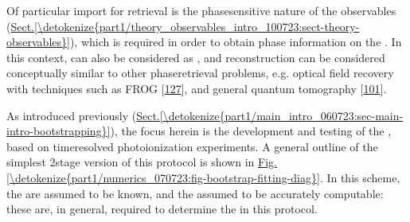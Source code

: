 \documentclass[letterpaper,table,10pt,english]{jupyterBook}
\begin{document}
\sphinxAtStartPar
Of particular import for {\hyperref[\detokenize{backmatter/glossary:term-radial-matrix-elements}]{}} retrieval is the phase\sphinxhyphen{}sensitive nature of the observables (\hyperref[\detokenize{part1/theory_observables_intro_100723:sect-theory-observables}]{Sect.\@ \ref{\detokenize{part1/theory_observables_intro_100723:sect-theory-observables}}}), which is required in order to obtain phase information on the {\hyperref[\detokenize{backmatter/glossary:term-partial-waves}]{}}. In this context, {\hyperref[\detokenize{backmatter/glossary:term-PADs}]{}} can also be considered as , and reconstruction can be considered conceptually similar to other phase\sphinxhyphen{}retrieval problems, e.g. optical field recovery with techniques such as FROG {[}\hyperlink{cite.backmatter/bibliography:id929}{127}{]}, and general quantum tomography {[}\hyperlink{cite.backmatter/bibliography:id782}{101}{]}.

\sphinxAtStartPar
As introduced previously (\hyperref[\detokenize{part1/main_intro_060723:sec-main-intro-bootstrapping}]{Sect.\@ \ref{\detokenize{part1/main_intro_060723:sec-main-intro-bootstrapping}}}), the focus herein is the development and testing of the , based on time\sphinxhyphen{}resolved {\hyperref[\detokenize{backmatter/glossary:term-RWP}]{}} photoionization experiments. A general outline of the simplest 2\sphinxhyphen{}stage version of this protocol is shown in \hyperref[\detokenize{part1/numerics_070723:fig-bootstrap-fitting-diag}]{Fig.\@ \ref{\detokenize{part1/numerics_070723:fig-bootstrap-fitting-diag}}}. In this scheme, the {\hyperref[\detokenize{backmatter/glossary:term-channel-functions}]{}} are assumed to be known, and the {\hyperref[\detokenize{backmatter/glossary:term-ADMs}]{}} assumed to be accurately computable: these are, in general, required to determine the {\hyperref[\detokenize{backmatter/glossary:term-radial-matrix-elements}]{}} in this protocol.
\end{document}
